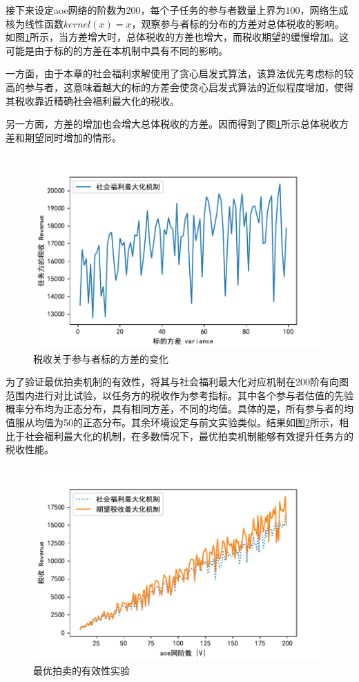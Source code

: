 \documentclass[promaster]{thesis-uestc}
\begin{document}
接下来设定aoe网络的阶数为$200$，每个子任务的参与者数量上界为$100$，网络生成核为线性函数$kernel(x)=x$，观察参与者标的分布的方差对总体税收的影响。如图\ref{revenuevsvar}所示，当方差增大时，总体税收的方差也增大，而税收期望的缓慢增加。这可能是由于标的的方差在本机制中具有不同的影响。

一方面，由于本章的社会福利求解使用了贪心启发式算法，该算法优先考虑标的较高的参与者，这意味着越大的标的方差会使贪心启发式算法的近似程度增加，使得其税收靠近精确社会福利最大化的税收。

另一方面，方差的增加也会增大总体税收的方差。因而得到了图\ref{revenuevsvar}所示总体税收方差和期望同时增加的情形。

\begin{figure}[H]
    \includegraphics[width=325pt]{exp/revenuevsvar.pdf}
    \caption{税收关于参与者标的方差的变化}
    \label{revenuevsvar}
\end{figure}

\FloatBarrier

为了验证最优拍卖机制的有效性，将其与社会福利最大化对应机制在200阶有向图范围内进行对比试验，以任务方的税收作为参考指标。其中各个参与者估值的先验概率分布均为正态分布，具有相同方差，不同的均值。具体的是，所有参与者的均值服从均值为50的正态分布。其余环境设定与前文实验类似。结果如图\ref{picc}所示，相比于社会福利最大化的机制，在多数情况下，最优拍卖机制能够有效提升任务方的税收性能。

\begin{figure}[H]
    \includegraphics[width=325pt]{exp/SWandoptimal.pdf}
    \caption{最优拍卖的有效性实验}
    \label{picc}
\end{figure}
\end{document}
